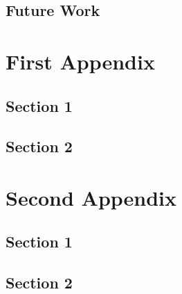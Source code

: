   \section{Future Work}\label{sec:}
    \lipsum[38]\cite{TEST}
        \printreferences


\bigskip 
\clearpage\singlespacing

\printbibliography[heading=bibintoc]
\bigskip

\appendix
\chapter{First Appendix}\label{app:}
  \section{Section 1}\label{sec:}
    \lipsum[34-36]
  \section{Section 2}\label{sec:}
    \lipsum[38]

\chapter{Second Appendix}\label{app:}
  \section{Section 1}\label{sec:}
    \lipsum[34-36]
  \section{Section 2}\label{sec:}
    \lipsum[38]




